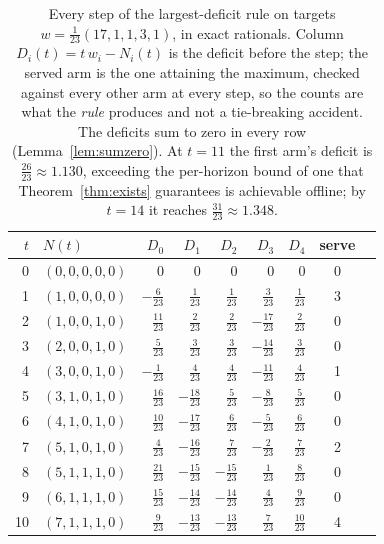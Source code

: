 \begin{table}[t]
\caption{Every step of the largest-deficit rule on targets
$w=\frac{1}{23}(17,1,1,3,1)$, in exact rationals. Column $D_{i}(t)=t\,w_{i}-N_{i}(t)$ is the
deficit before the step; the served arm is the one attaining the maximum, checked against
every other arm at every step, so the counts are what the \emph{rule} produces and not a
tie-breaking accident. The deficits sum to zero in every row
(Lemma~\ref{lem:sumzero}). At $t=11$ the first arm's deficit is
$\frac{26}{23}\approx1.130$, exceeding the per-horizon bound of one that
Theorem~\ref{thm:exists} guarantees is achievable offline; by $t=14$ it reaches
$\frac{31}{23}\approx1.348$.}
\label{tab:trace}
\centering
\footnotesize
\setlength{\tabcolsep}{5pt}
\begin{tabular}{@{}rlrrrrrcl@{}}
\toprule
$t$ & $N(t)$ & $D_{0}$ & $D_{1}$ & $D_{2}$ & $D_{3}$ & $D_{4}$ & serve & \\
\midrule
0 & $(0,0,0,0,0)$ & $0$ & $0$ & $0$ & $0$ & $0$ & 0 &  \\
1 & $(1,0,0,0,0)$ & $-\frac{6}{23}$ & $\frac{1}{23}$ & $\frac{1}{23}$ & $\frac{3}{23}$ & $\frac{1}{23}$ & 3 &  \\
2 & $(1,0,0,1,0)$ & $\frac{11}{23}$ & $\frac{2}{23}$ & $\frac{2}{23}$ & $-\frac{17}{23}$ & $\frac{2}{23}$ & 0 &  \\
3 & $(2,0,0,1,0)$ & $\frac{5}{23}$ & $\frac{3}{23}$ & $\frac{3}{23}$ & $-\frac{14}{23}$ & $\frac{3}{23}$ & 0 &  \\
4 & $(3,0,0,1,0)$ & $-\frac{1}{23}$ & $\frac{4}{23}$ & $\frac{4}{23}$ & $-\frac{11}{23}$ & $\frac{4}{23}$ & 1 &  \\
5 & $(3,1,0,1,0)$ & $\frac{16}{23}$ & $-\frac{18}{23}$ & $\frac{5}{23}$ & $-\frac{8}{23}$ & $\frac{5}{23}$ & 0 &  \\
6 & $(4,1,0,1,0)$ & $\frac{10}{23}$ & $-\frac{17}{23}$ & $\frac{6}{23}$ & $-\frac{5}{23}$ & $\frac{6}{23}$ & 0 &  \\
7 & $(5,1,0,1,0)$ & $\frac{4}{23}$ & $-\frac{16}{23}$ & $\frac{7}{23}$ & $-\frac{2}{23}$ & $\frac{7}{23}$ & 2 &  \\
8 & $(5,1,1,1,0)$ & $\frac{21}{23}$ & $-\frac{15}{23}$ & $-\frac{15}{23}$ & $\frac{1}{23}$ & $\frac{8}{23}$ & 0 &  \\
9 & $(6,1,1,1,0)$ & $\frac{15}{23}$ & $-\frac{14}{23}$ & $-\frac{14}{23}$ & $\frac{4}{23}$ & $\frac{9}{23}$ & 0 &  \\
10 & $(7,1,1,1,0)$ & $\frac{9}{23}$ & $-\frac{13}{23}$ & $-\frac{13}{23}$ & $\frac{7}{23}$ & $\frac{10}{23}$ & 4 &  \\

\end{tabular}
\end{table}

